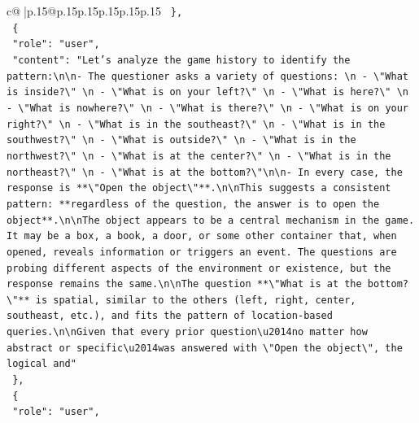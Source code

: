 \documentclass{article}
\begin{document}
{\begin{supertabular}{c@{$\;$}|p{.15\linewidth}@{}p{.15\linewidth}p{.15\linewidth}p{.15\linewidth}p{.15\linewidth}p{.15\linewidth}}
{{{\texttt{  \},} \\
\texttt{  \{} \\
\texttt{    "role": "user",} \\
\texttt{    "content": "Let's analyze the game history to identify the pattern:\textbackslash{}n\textbackslash{}n{-} The questioner asks a variety of questions:  \textbackslash{}n  {-} \textbackslash{}"What is inside?\textbackslash{}"  \textbackslash{}n  {-} \textbackslash{}"What is on your left?\textbackslash{}"  \textbackslash{}n  {-} \textbackslash{}"What is here?\textbackslash{}"  \textbackslash{}n  {-} \textbackslash{}"What is nowhere?\textbackslash{}"  \textbackslash{}n  {-} \textbackslash{}"What is there?\textbackslash{}"  \textbackslash{}n  {-} \textbackslash{}"What is on your right?\textbackslash{}"  \textbackslash{}n  {-} \textbackslash{}"What is in the southeast?\textbackslash{}"  \textbackslash{}n  {-} \textbackslash{}"What is in the southwest?\textbackslash{}"  \textbackslash{}n  {-} \textbackslash{}"What is outside?\textbackslash{}"  \textbackslash{}n  {-} \textbackslash{}"What is in the northwest?\textbackslash{}"  \textbackslash{}n  {-} \textbackslash{}"What is at the center?\textbackslash{}"  \textbackslash{}n  {-} \textbackslash{}"What is in the northeast?\textbackslash{}"  \textbackslash{}n  {-} \textbackslash{}"What is at the bottom?\textbackslash{}"\textbackslash{}n\textbackslash{}n{-} In every case, the response is **\textbackslash{}"Open the object\textbackslash{}"**.\textbackslash{}n\textbackslash{}nThis suggests a consistent pattern: **regardless of the question, the answer is to open the object**.\textbackslash{}n\textbackslash{}nThe object appears to be a central mechanism in the game. It may be a box, a book, a door, or some other container that, when opened, reveals information or triggers an event. The questions are probing different aspects of the environment or existence, but the response remains the same.\textbackslash{}n\textbackslash{}nThe question **\textbackslash{}"What is at the bottom?\textbackslash{}"** is spatial, similar to the others (left, right, center, southeast, etc.), and fits the pattern of location{-}based queries.\textbackslash{}n\textbackslash{}nGiven that every prior question\textbackslash{}u2014no matter how abstract or specific\textbackslash{}u2014was answered with \textbackslash{}"Open the object\textbackslash{}", the logical and"} \\
\texttt{  \},} \\
\texttt{  \{} \\
\texttt{    "role": "user",} \\
}}}
\end{supertabular}}
\end{document}

